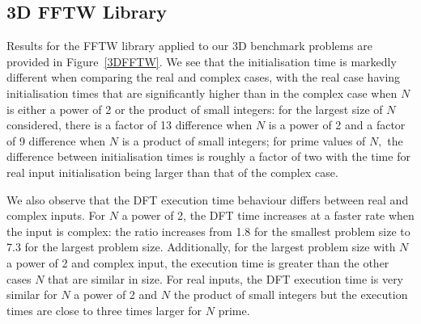 \documentclass[12pt, a4paper]{article} \setlength{\textheight}{24cm}
\begin{document}
\subsection{3D FFTW Library}
Results for the FFTW library applied to our 3D benchmark problems are
provided in Figure~\ref{3DFFTW}. We see that the initialisation time
is markedly different when comparing the real and complex cases, with
the real case having initialisation times that are significantly
higher than in the complex case when $N$ is either a power of 2 or the
product of small integers: for the largest size of $N$ considered,
there is a factor of 13 difference when $N$ is a power of 2 and a
factor of 9 difference when $N$ is a product of small integers; for
prime values of $N,$ the difference between initialisation times is
roughly a factor of two with the time for real input initialisation
being larger than that of the complex case.

We also observe that the DFT execution time behaviour differs between
real and complex inputs. For $N$ a power of 2, the DFT time increases
at a faster rate when the input is complex: the ratio increases from
1.8 for the smallest problem size to 7.3 for the largest problem size.
Additionally, for the largest problem size with $N$ a power of 2 and
complex input, the execution time is greater than the other cases $N$
that are similar in size. For real inputs, the DFT execution time is
very similar for $N$ a power of 2 and $N$ the product of small
integers but the execution times are close to three times larger for
$N$ prime.
\end{document}
